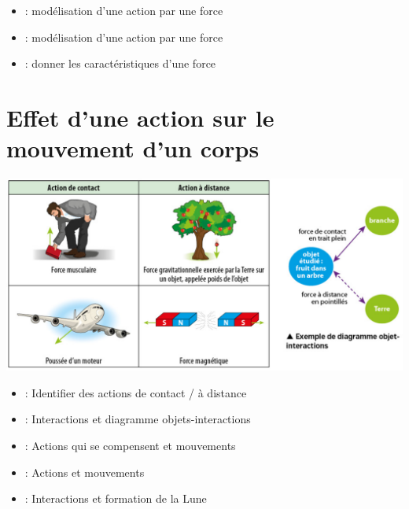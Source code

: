 \documentclass[12pt,a4paper]{article}
\begin{document}
\begin{myexos}
	\begin{itemize}
		\item {} : modélisation d'une action par une force
		\item {} : modélisation d'une action par une force
		\item {} : donner les caractéristiques d'une force
	\end{itemize}
\end{myexos}



\section{Effet d'une action sur le mouvement d'un corps}







	\begin{center}
		\includegraphics[scale=0.4]{ex_actions_doi}
	\end{center}


\begin{myexos}
	\begin{itemize}
		\item {} : Identifier des actions de contact / à distance
		\item {} : Interactions et diagramme objets-interactions
		\item {} : Actions qui se compensent et mouvements
		\item {} : Actions et mouvements
		\item {} : Interactions et formation de la Lune
		
	\end{itemize}
\end{myexos}

%
%
%
\end{document}
